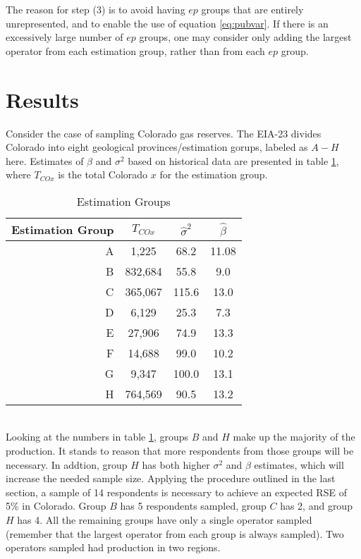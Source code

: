 \documentclass[11pt]{article} %
\begin{document}
The reason for step (3) is to avoid having $ep$ groups that are entirely unrepresented, and to enable the use of equation \ref{eq:pubvar}. If there is an excessively large number of $ep$ groups, one may consider only adding the largest operator from each estimation group, rather than from each $ep$ group.


\section{Results}
Consider the case of sampling Colorado gas reserves.  The EIA-23 divides Colorado into eight geological provinces/estimation gorups, labeled as $A-H$ here. Estimates of $\beta$ and $\sigma^2$ based on historical data are presented in table \ref{tab:E_ests}, where $T_{COx}$ is the total Colorado $x$ for the estimation group. 
\\
\begin{table}[h]
\begin{tabular}{r||c|c|c|} 
Estimation Group & $T_{CO x}$  & $\hat{\sigma}^2$ & $\hat{\beta}$\\
\hline
A & 1,225 & 68.2 & 11.08\\
B & 832,684 & 55.8 & 9.0 \\
C & 365,067 & 115.6 & 13.0 \\
D & 6,129 & 25.3 & 7.3 \\
E & 27,906 & 74.9 & 13.3 \\
F & 14,688 & 99.0 & 10.2 \\
G & 9,347 & 100.0 & 13.1 \\
H & 764,569 & 90.5 & 13.2 \\
\end{tabular}
\caption{Estimation Groups}
\label{tab:E_ests}
\end{table}
\\
Looking at the numbers in table \ref{tab:E_ests}, groups $B$ and $H$ make up the majority of the production. It stands to reason that more respondents from those groups will be necessary. In addtion, group $H$ has both higher $\sigma^2$ and $\beta$ estimates, which will increase the needed sample size. Applying the procedure outlined in the last section, a sample of 14 respondents is necessary to achieve an expected RSE of 5\% in Colorado. Group $B$ has 5 respondents sampled, group $C$ has 2, and group $H$ has 4. All the remaining groups have only a single operator sampled (remember that the largest operator from each group is always sampled). Two operators sampled had production in two regions.
\end{document}
